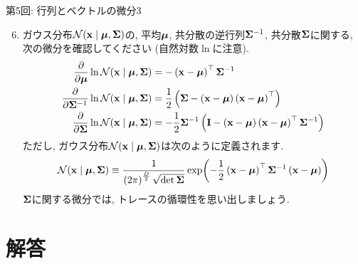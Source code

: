 \documentclass[dvipdfmx,notheorems,t]{beamer}
\begin{document}
\begin{frame}{第5回: 行列とベクトルの微分3}
\begin{enumerate}
  \setcounter{enumi}{5}
  \item ガウス分布$\mathcal{N}(\vb{x} \mid \vb*{\mu}, \vb{\Sigma})$の,
  平均$\vb*{\mu}$, 共分散の逆行列$\vb{\Sigma}^{-1}$, 共分散$\vb{\Sigma}$に関する,
  次の微分を確認してください (自然対数$\ln$に注意).
  \begin{align*}
    \pdv{\vb*{\mu}} \ln \mathcal{N}(\vb{x} \mid \vb*{\mu}, \vb{\Sigma})
    &= -\left( \vb{x} - \vb*{\mu} \right)^\top \vb{\Sigma}^{-1} \\
    \pdv{\vb{\Sigma}^{-1}} \ln \mathcal{N}(\vb{x} \mid \vb*{\mu}, \vb{\Sigma})
    &= \frac{1}{2} \left( \vb{\Sigma}
      - \left( \vb{x} - \vb*{\mu} \right) \left( \vb{x} - \vb*{\mu} \right)^\top \right) \\
    \pdv{\vb{\Sigma}} \ln \mathcal{N}(\vb{x} \mid \vb*{\mu}, \vb{\Sigma})
    &= -\frac{1}{2} \vb{\Sigma}^{-1} \left( \vb{I}
      - \left( \vb{x} - \vb*{\mu} \right) \left( \vb{x} - \vb*{\mu} \right)^\top
      \vb{\Sigma}^{-1} \right)
  \end{align*}
  ただし, ガウス分布$\mathcal{N}(\vb{x} \mid \vb*{\mu}, \vb{\Sigma})$は次のように定義されます.
  \begin{align*}
    \mathcal{N}(\vb{x} \mid \vb*{\mu}, \vb{\Sigma})
      \equiv \frac{1}{\left( 2\pi \right)^\frac{D}{2} \sqrt{\det \vb{\Sigma}}}
      \exp(-\frac{1}{2} \left( \vb{x} - \vb*{\mu} \right)^\top \vb{\Sigma}^{-1}
        \left( \vb{x} - \vb*{\mu} \right))
  \end{align*}
  $\vb{\Sigma}$に関する微分では, トレースの循環性を思い出しましょう.
\end{enumerate}
\end{frame}

\begin{frame}{}
\end{frame}

\section{解答}
\end{document}
